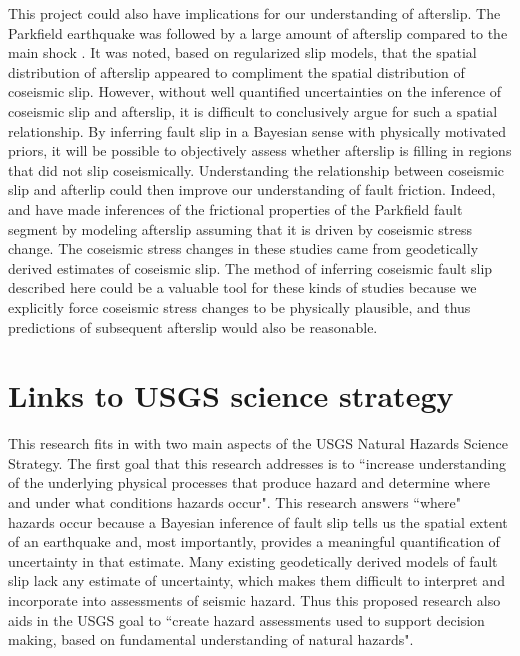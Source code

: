 \documentclass[12pt]{article}
\begin{document}
This project could also have implications for our understanding of afterslip.  The Parkfield earthquake was followed by a large amount of afterslip compared to the main shock \citep{Langbein2006,Johanson2006}.  It was noted, based on regularized slip models, that the spatial distribution of afterslip appeared to compliment the spatial distribution of coseismic slip.  However, without well quantified uncertainties on the inference of coseismic slip and afterslip, it is difficult to conclusively argue for such a spatial relationship. By inferring fault slip in a Bayesian sense with physically motivated priors, it will be possible to objectively assess whether afterslip is filling in regions that did not slip coseismically.  Understanding the relationship between coseismic slip and afterlip could then improve our understanding of fault friction.  Indeed, \citet{Johnson2006} and \citet{Barbot2009} have made inferences of the frictional properties of the Parkfield fault segment by modeling afterslip assuming that it is driven by coseismic stress change.  The coseismic stress changes in these studies came from geodetically derived estimates of coseismic slip.  The method of inferring coseismic fault slip described here could be a valuable tool for these kinds of studies because we explicitly force coseismic stress changes to be physically plausible, and thus predictions of subsequent afterslip would also be reasonable.  

\section*{Links to USGS science strategy}
This research fits in with two main aspects of the USGS Natural Hazards Science Strategy.  The first goal that this research addresses is to ``increase understanding of the underlying physical processes that produce hazard and determine where and under what conditions hazards occur".  This research answers ``where" hazards occur because a Bayesian inference of fault slip tells us the spatial extent of an earthquake and, most importantly, provides a meaningful quantification of uncertainty in that estimate.  Many existing geodetically derived models of fault slip lack any estimate of uncertainty, which makes them difficult to interpret and incorporate into assessments of seismic hazard. Thus this proposed research also aids in the USGS goal to ``create hazard assessments used to support decision making, based on fundamental understanding of natural hazards".
\end{document}
